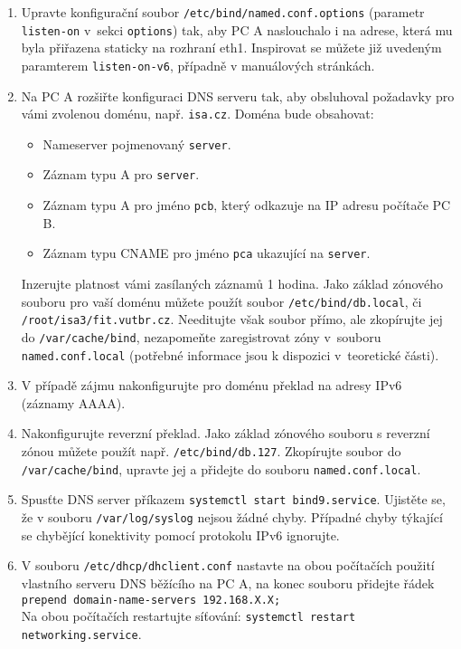 \begin{enumerate}
  \item Upravte konfigurační soubor {\tt /etc/bind/named.conf.options} (parametr
    {\tt listen-on} v~sekci {\tt options}) tak, aby
    PC A naslouchalo i na adrese, která mu byla přiřazena staticky na rozhraní eth1.
    Inspirovat se můžete již uvedeným paramterem {\tt listen-on-v6}, případně v
    manuálových stránkách.
  \item Na PC A rozšiřte konfiguraci DNS serveru tak, aby obsluhoval požadavky pro vámi
    zvolenou doménu, např. {\tt isa.cz}. Doména bude obsahovat:
    \begin{itemize}
      \item Nameserver pojmenovaný {\tt server}.
      \item Záznam typu A pro {\tt server}.
      \item Záznam typu A pro jméno {\tt pcb}, který odkazuje na IP adresu
        počítače PC B.
      \item Záznam typu CNAME pro jméno {\tt pca} ukazující na {\tt server}.
    \end{itemize}
    Inzerujte platnost vámi zasílaných záznamů 1 hodina.
    Jako základ zónového souboru pro vaší
    doménu můžete použít soubor {\tt /etc/bind/db.local}, či {\tt
    /root/isa3/fit.vutbr.cz}.
    Needitujte však soubor přímo, ale zkopírujte jej do {\tt /var/cache/bind},
    nezapomeňte zaregistrovat zóny
    v~souboru {\tt named.conf.local} (potřebné informace jsou k dispozici
    v~teoretické části).
  \item V případě zájmu nakonfigurujte pro doménu překlad na adresy IPv6
    (záznamy AAAA).
  \item Nakonfigurujte reverzní překlad. Jako základ
    zónového souboru s reverzní zónou můžete použít např. {\tt /etc/bind/db.127}.
    Zkopírujte soubor do {\tt /var/cache/bind}, upravte jej a přidejte do
    souboru {\tt named.conf.local}.
  \item Spusťte DNS server příkazem {\tt systemctl start bind9.service}.
    Ujistěte se, že v souboru {\tt /var/log/syslog} nejsou žádné chyby. Případné
    chyby týkající se chybějící konektivity pomocí protokolu IPv6 ignorujte.
  \item V souboru {\tt /etc/dhcp/dhclient.conf} nastavte na obou počítačích použití vlastního
    serveru DNS běžícího na PC A, na konec souboru přidejte řádek \\
    {\tt prepend domain-name-servers
    192.168.X.X;} \\ Na obou počítačích restartujte síťování: {\tt systemctl restart networking.service}.

\end{enumerate}
